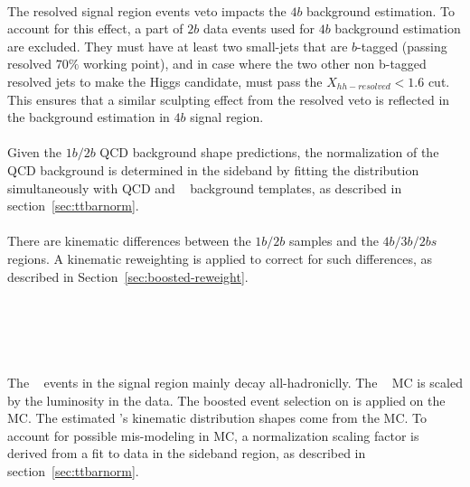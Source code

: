 \paragraph{} 
The resolved signal region events veto impacts the $4b$ background estimation. 
To account for this effect, a part of $2b$ data events used for $4b$ background estimation are excluded. 
They must have at least two small-\R jets that are $b$-tagged (passing resolved $70\%$ working point), and in case where the two other non b-tagged resolved jets to make the Higgs candidate, must pass the $X_{hh-resolved} < 1.6$ cut. 
This ensures that a similar sculpting effect from the resolved veto is reflected in the background estimation in $4b$ signal region.

\paragraph{}
Given the $1b/2b$ QCD background shape predictions, the normalization of the QCD background is determined in the sideband by fitting the \mleadJ distribution simultaneously with QCD and \ttbar~ background templates, as described in section~\ref{sec:ttbarnorm}.

\paragraph{}
There are kinematic differences between the $1b/2b$ samples and the $4b/3b/2bs$ regions.  
A kinematic reweighting is applied to correct for such differences, as described in Section~\ref{sec:boosted-reweight}.


\section{\ttbar~}
\label{sec:boosted-ttbar}

\paragraph{}
The \ttbar~ events in the signal region mainly decay all-hadroniclly.
The \ttbar~ MC is scaled by the luminosity in the data.
The boosted event selection on is applied on the \ttbar~ MC.
The estimated \ttbar's kinematic distribution shapes come from the MC.
To account for possible mis-modeling in MC, a normalization scaling factor is derived from a fit to data in the sideband region, as described in section~\ref{sec:ttbarnorm}.

